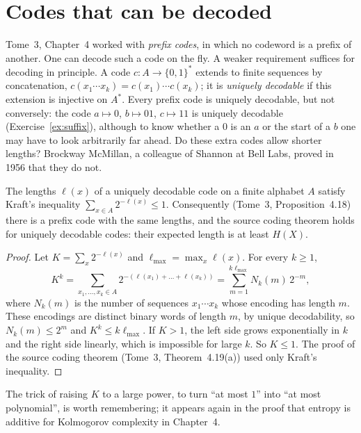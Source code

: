 \section{Codes that can be decoded}\label{sec:ud}

Tome~3, Chapter~4 worked with \emph{prefix codes}, in which no codeword is a prefix of another. One can decode such a code on the fly. A weaker requirement suffices for decoding in principle. A code $c:A\to\{0,1\}^*$ extends to finite sequences by concatenation, $c(x_1\cdots x_k)=c(x_1)\cdots c(x_k)$; it is \emph{uniquely decodable} if this extension is injective on $A^*$. Every prefix code is uniquely decodable, but not conversely: the code $a\mapsto0$, $b\mapsto01$, $c\mapsto11$ is uniquely decodable (Exercise~\ref{ex:suffix}), although to know whether a $0$ is an $a$ or the start of a $b$ one may have to look arbitrarily far ahead. Do these extra codes allow shorter lengths? Brockway McMillan, a colleague of Shannon at Bell Labs, proved in 1956 that they do not.

\begin{theorem}[McMillan 1956]\label{thm:mcmillan}
The lengths $\ell(x)$ of a uniquely decodable code on a finite alphabet $A$ satisfy Kraft's inequality $\sum_{x\in A}2^{-\ell(x)}\le1$. Consequently (Tome~3, Proposition~4.18) there is a prefix code with the same lengths, and the source coding theorem holds for uniquely decodable codes: their expected length is at least $H(X)$.
\end{theorem}

\begin{proof}
Let $K=\sum_x2^{-\ell(x)}$ and $\ell_{\max}=\max_x\ell(x)$. For every $k\ge1$,
\[
K^k=\sum_{x_1,\dots,x_k\in A}2^{-(\ell(x_1)+\dots+\ell(x_k))}=\sum_{m=1}^{k\ell_{\max}}N_k(m)\,2^{-m},
\]
where $N_k(m)$ is the number of sequences $x_1\cdots x_k$ whose encoding has length $m$. These encodings are distinct binary words of length $m$, by unique decodability, so $N_k(m)\le2^m$ and $K^k\le k\ell_{\max}$. If $K>1$, the left side grows exponentially in $k$ and the right side linearly, which is impossible for large $k$. So $K\le1$. The proof of the source coding theorem (Tome~3, Theorem~4.19(a)) used only Kraft's inequality.
\end{proof}

The trick of raising $K$ to a large power, to turn ``at most $1$'' into ``at most polynomial'', is worth remembering; it appears again in the proof that entropy is additive for Kolmogorov complexity in Chapter~4.

